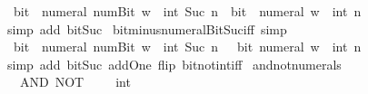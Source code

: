 \begin{isabellebody}
\ \ {\isacartoucheopen}bit\ {\isacharparenleft}{\kern0pt}{\isacharminus}{\kern0pt}\ numeral\ {\isacharparenleft}{\kern0pt}num{\isachardot}{\kern0pt}Bit{}\ w{\isacharparenright}{\kern0pt}\ {\isacharcolon}{\kern0pt}{\isacharcolon}{\kern0pt}\ int{\isacharparenright}{\kern0pt}\ {\isacharparenleft}{\kern0pt}Suc\ n{\isacharparenright}{\kern0pt}\ {\isasymlongleftrightarrow}\ bit\ {\isacharparenleft}{\kern0pt}{\isacharminus}{\kern0pt}\ numeral\ w\ {\isacharcolon}{\kern0pt}{\isacharcolon}{\kern0pt}\ int{\isacharparenright}{\kern0pt}\ n{\isacartoucheclose}\isanewline
%
\isadelimproof
\ \ %
\endisadelimproof
%
\isatagproof
{}\isamarkupfalse%
\ {\isacharparenleft}{\kern0pt}simp\ add{\isacharcolon}{\kern0pt}\ bit{\isacharunderscore}{\kern0pt}Suc{\isacharparenright}{\kern0pt}%
\endisatagproof
{\isafoldproof}%
%
\isadelimproof
\isanewline
%
\endisadelimproof
\isanewline
{}\isamarkupfalse%
\ bit{\isacharunderscore}{\kern0pt}minus{\isacharunderscore}{\kern0pt}numeral{\isacharunderscore}{\kern0pt}Bit{}{\isacharunderscore}{\kern0pt}Suc{\isacharunderscore}{\kern0pt}iff\ {\isacharbrackleft}{\kern0pt}simp{\isacharbrackright}{\kern0pt}{\isacharcolon}{\kern0pt}\isanewline
\ \ {\isacartoucheopen}bit\ {\isacharparenleft}{\kern0pt}{\isacharminus}{\kern0pt}\ numeral\ {\isacharparenleft}{\kern0pt}num{\isachardot}{\kern0pt}Bit{}\ w{\isacharparenright}{\kern0pt}\ {\isacharcolon}{\kern0pt}{\isacharcolon}{\kern0pt}\ int{\isacharparenright}{\kern0pt}\ {\isacharparenleft}{\kern0pt}Suc\ n{\isacharparenright}{\kern0pt}\ {\isasymlongleftrightarrow}\ {\isasymnot}\ bit\ {\isacharparenleft}{\kern0pt}numeral\ w\ {\isacharcolon}{\kern0pt}{\isacharcolon}{\kern0pt}\ int{\isacharparenright}{\kern0pt}\ n{\isacartoucheclose}\isanewline
%
\isadelimproof
\ \ %
\endisadelimproof
%
\isatagproof
{}\isamarkupfalse%
\ {\isacharparenleft}{\kern0pt}simp\ add{\isacharcolon}{\kern0pt}\ bit{\isacharunderscore}{\kern0pt}Suc\ add{\isacharunderscore}{\kern0pt}One\ flip{\isacharcolon}{\kern0pt}\ bit{\isacharunderscore}{\kern0pt}not{\isacharunderscore}{\kern0pt}int{\isacharunderscore}{\kern0pt}iff{\isacharparenright}{\kern0pt}%
\endisatagproof
{\isafoldproof}%
%
\isadelimproof
\isanewline
%
\endisadelimproof
\isanewline
{}\isamarkupfalse%
\ and{\isacharunderscore}{\kern0pt}not{\isacharunderscore}{\kern0pt}numerals{\isacharcolon}{\kern0pt}\isanewline
\ \ {\isacartoucheopen}{}\ AND\ NOT\ {}\ {\isacharequal}{\kern0pt}\ {\isacharparenleft}{\kern0pt}{}\ {\isacharcolon}{\kern0pt}{\isacharcolon}{\kern0pt}\ int{\isacharparenright}{\kern0pt}{\isacartoucheclose}\isanewline

\end{isabellebody}
